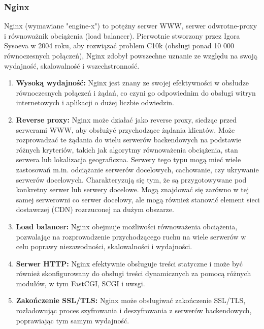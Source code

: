 \subsubsection{Nginx}
Nginx (wymawiane "engine-x") to potężny serwer WWW, serwer odwrotne-proxy i równoważnik obciążenia (load balancer). Pierwotnie stworzony przez Igora Sysoeva w 2004 roku, aby rozwiązać problem C10k (obsługi ponad 10 000 równoczesnych połączeń), Nginx zdobył powszechne uznanie ze względu na swoją wydajność, skalowalność i wszechstronność.
\\


\begin{enumerate}
\item {\bf Wysoką wydajność: }
Nginx jest znany ze swojej efektywności w obsłudze równoczesnych połączeń i żądań, co czyni go odpowiednim do obsługi witryn internetowych i aplikacji o dużej liczbie odwiedzin.

\item {\bf Reverse proxy:}
Nginx może działać jako reverse proxy, siedząc przed serwerami WWW, aby obsłużyć przychodzące żądania klientów. Może rozprowadzać te żądania do wielu serwerów backendowych na podstawie różnych kryteriów, takich jak algorytmy równoważenia obciążenia, stan serwera lub lokalizacja geograficzna.
Serwery tego typu mogą mieć wiele zastosowań m.in. odciążanie serwerów docelowych, cachowanie, czy ukrywanie serwerów docelowych. Charakteryzują się tym, że są przygotowywane pod konkretny serwer lub serwery docelowe. Mogą znajdować się zarówno w tej samej serwerowni co serwer docelowy, ale mogą również stanowić element sieci dostawczej (CDN) rozrzuconej na dużym obszarze.

\item {\bf Load balancer: }
Nginx obejmuje możliwości równoważenia obciążenia, pozwalając na rozprowadzenie przychodzącego ruchu na wiele serwerów w celu poprawy niezawodności, skalowalności i wydajności.

\item {\bf Serwer HTTP:} 
Nginx efektywnie obsługuje treści statyczne i może być również skonfigurowany do obsługi treści dynamicznych za pomocą różnych modułów, w tym FastCGI, SCGI i uwsgi.

\item {\bf Zakończenie SSL/TLS:}
Nginx może obsługiwać zakończenie SSL/TLS, rozładowując proces szyfrowania i deszyfrowania z serwerów backendowych, poprawiając tym samym wydajność.


\end{enumerate}
